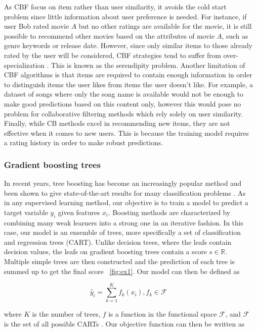 \documentclass[cic,tc,english]{iiufrgs}
\begin{document}
As CBF focus on item rather than user similarity, it avoids the cold start problem since little information about user preference is needed. For instance, if user Bob rated movie $A$ but no other ratings are available for the movie, it is still possible to recommend other movies based on the attributes of movie $A$, such as genre keywords or release date. However, since only similar items to those already rated by the user will be considered, CBF strategies tend to suffer from over-specialization \cite{Iaquinta2008}. This is known as the serendipity problem. Another limitation of CBF algorithms is that items are required to contain enough information in order to distinguish items the user likes from items the user doesn't like. For example, a dataset of songs where only the song name is available would not be enough to make good predictions based on this content only, however this would pose no problem for collaborative filtering methods which rely solely on user similarity. Finally, while CB methods excel in recommending new items, they are not effective when it comes to new users. This is because the training model requires a rating history in order to make robust predictions.

\subsubsection{Gradient boosting trees}
In recent years, tree boosting has become an increasingly popular method and been shown to give state-of-the-art results for many classification problems \cite{Li2012}. As in any supervised learning method, our objective is to train a model to predict a target variable $y_i$ given features $x_i$. Boosting methods are characterized by combining many weak learners into a strong one in an iterative fashion. In this case, our model is an ensemble of trees, more specifically a set of classification and regression trees (CART). Unlike decision trees, where the leafs contain decision values, the leafs on gradient boosting trees contain a score $s \in \mathbb{R}$. Multiple simple trees are then constructed and the prediction of each tree is summed up to get the final score ~\ref{fig:ex1}. Our model can then be defined as

$$\hat{y}_i = \sum_{k=1}^K f_k(x_i), f_k \in \mathcal{F}$$

where \(K\) is the number of trees, \(f\) is a function in the functional space $\mathcal{F}$, and $\mathcal{F}$ is the set of all possible CARTs \cite{Chen2016}. Our objective function can then be written as
\end{document}
